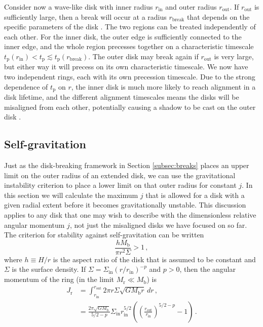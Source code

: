 \documentclass[twocolumn,linenumbers]{aastex631}
\newcommand{\RR}[1]{\textcolor{blue}{\bf#1}} %
\begin{document}
Consider now a wave-like disk with inner radius $r_\text{in}$ and outer radius $r_\text{out}$. If $r_\text{out}$ is sufficiently large, then a break will occur at a radius $r_\text{break}$ that depends on the specific parameters of the disk \citep[see][eq. (9)]{rabago2024}. The two regions can be treated independently of each other. For the inner disk, the outer edge is sufficiently connected to the inner edge, and the whole region precesses together on a characteristic timescale $t_\text{p}(r_\text{in}) < t_\text{p} \lesssim t_\text{p}(r_\text{break})$. The outer disk may break again if $r_\text{out}$ is very large, but either way it will precess on its own characteristic timescale. We now have two independent rings, each with its own precession timescale. Due to the strong dependence of $t_\text{p}$ on $r$, the inner disk is much more likely to reach alignment in a disk lifetime, and the different alignment timescales means the disks will be misaligned from each other, potentially causing a shadow to be cast on the outer disk \RR{\citep[see][]{bohn2022,benisty2023,su2024,zhang2024,zhu2024}}.

\subsection{Self-gravitation}
\label{subsec:toomre}
Just as the disk-breaking framework in Section \ref{subsec:breaks} places an upper limit on the outer radius of an extended disk, we can use the gravitational instability criterion to place a lower limit on that outer radius for constant $j$. In this section we will calculate the maximum $j$ that is allowed for a disk with a given radial extent before it becomes gravitationally unstable. This discussion applies to any disk that one may wish to describe with the dimensionless relative angular momentum $j$, not just the misaligned disks we have focused on so far. The criterion for stability against self-gravitation \citep{toomre1964} can be written
\begin{equation}
    \label{eq:toomre}
    \frac{hM_\text{b}}{\pi r^2 \Sigma} > 1\, ,
\end{equation}
where $h\equiv H/r$ is the aspect ratio of the disk that is assumed to be constant and $\Sigma$ is the surface density. If $\Sigma = \Sigma_\text{in} (r/r_\text{in})^{-p}$ and $p>0$, then the angular momentum of the ring (in the limit $M_\text{r} \ll M_\text{b}$) is
\begin{align}
    J_\text{r} &= \int_{r_\text{in}}^{r_\text{out}} 2\pi r \Sigma  \sqrt{GM_\text{b}r}\,dr \, , \nonumber \\
    & = \frac{2\pi\sqrt{GM_\text{b}}}{5/2 - p} \Sigma_\text{in} r_\text{in}^{5/2} \left( \left( \frac{r_\text{out}}{r_\text{in}} \right)^{5/2 - p}- 1\right)\, \label{eq:Jr}.
\end{align}
\end{document}
